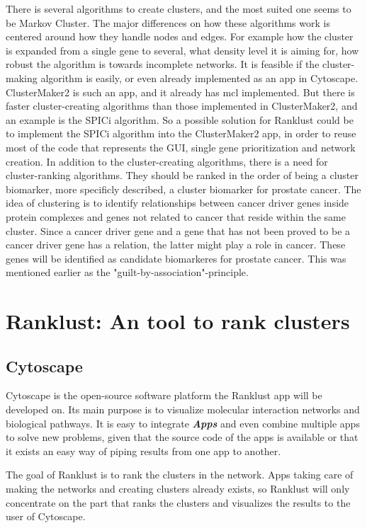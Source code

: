 There is several algorithms to create clusters, and the most suited one seems to
be Markov Cluster\cite{mcl,mcl-inflation}. The major differences on how these
algorithms work is centered around how they handle nodes and edges.  For example
how the cluster is expanded from a single gene to several, what density level it
is aiming for, how robust the algorithm is towards incomplete networks. It is
feasible if the cluster-making algorithm is easily, or even already implemented
as an app in Cytoscape. ClusterMaker2 is such an app, and it already has
\gls{mcl} implemented\cite{cm2}. But there is faster cluster-creating algorithms
than those implemented in ClusterMaker2, and an example is the SPICi
\cite{spici} algorithm. So a possible solution for Ranklust could be to
implement the SPICi algorithm into the ClusterMaker2 app, in order to reuse most
of the code that represents the GUI, single gene prioritization and network
creation. In addition to the cluster-creating algorithms, there is a need for
cluster-ranking algorithms.  They should be ranked in the order of being
a cluster biomarker, more specificly described, a cluster biomarker for prostate
cancer. The idea of clustering is to identify relationships between cancer
driver genes inside protein complexes and genes not related to cancer that
reside within the same cluster. Since a cancer driver gene and a gene that has
not been proved to be a cancer driver gene has a relation, the latter might play
a role in cancer. These genes will be identified as candidate biomarkeres for
prostate cancer. This was mentioned earlier as the
"guilt-by-association"-principle.

\chapter{Ranklust: An tool to rank clusters}
\section{Cytoscape}
Cytoscape is the open-source software platform the Ranklust app will be
developed on. Its main purpose is to visualize molecular interaction networks
and biological pathways. It is easy to integrate \textbf{\textit{Apps}} and
even combine multiple apps to solve new problems, given that the source code of
the apps is available or that it exists an easy way of piping results from one
app to another. 

The goal of Ranklust is to rank the clusters in the network. Apps taking care of
making the networks and creating clusters already exists, so Ranklust will only
concentrate on the part that ranks the clusters and visualizes the results to
the user of Cytoscape.

